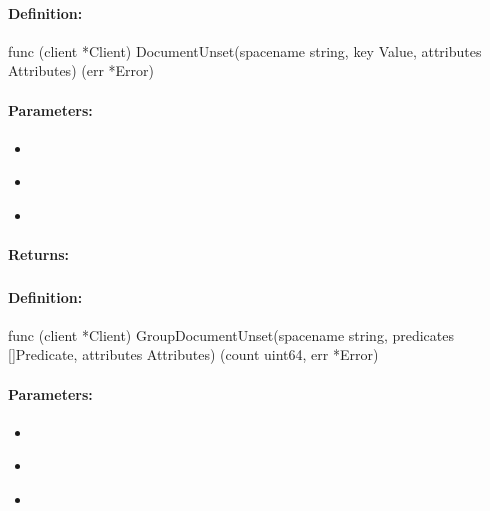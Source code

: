 \paragraph{Definition:}
\begin{gocode}
func (client *Client) DocumentUnset(spacename string, key Value, attributes Attributes) (err *Error)
\end{gocode}

\paragraph{Parameters:}
\begin{itemize}[noitemsep]
\item {}\\

\item {}\\

\item {}\\

\end{itemize}

\paragraph{Returns:}


\pagebreak
\subsubsection{}
\label{api:Go:GroupDocumentUnset}


\paragraph{Definition:}
\begin{gocode}
func (client *Client) GroupDocumentUnset(spacename string, predicates []Predicate, attributes Attributes) (count uint64, err *Error)
\end{gocode}

\paragraph{Parameters:}
\begin{itemize}[noitemsep]
\item {}\\

\item {}\\

\item {}\\

\end{itemize}

